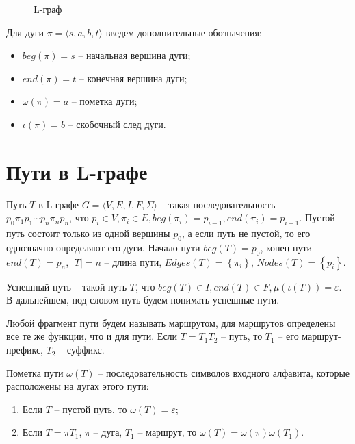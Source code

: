 \begin{figure}
    \centering
    
    \caption{L-граф}
    \label{lgraph1-expample-image}
    
\end{figure}

Для дуги $\pi = \langle s, a, b, t \rangle$ введем дополнительные обозначения:
\begin{itemize}
    \item $beg(\pi) = s$ -- начальная вершина дуги;
    \item $end(\pi) = t$ -- конечная вершина дуги;
    \item $\omega(\pi) = a$ -- пометка дуги;
    \item $\iota(\pi) = b$ -- скобочный след дуги.
\end{itemize}

\section{Пути в L-графе}
Путь $T$ в L-графе $G=\langle V,E,I,F,\Sigma\rangle$ -- такая последовательность \\ 
$p_0 \pi_1 p_1 \cdots p_n \pi_n p_n$, что 
$p_i \in V, \pi_i \in E, beg(\pi_i) = p_{i-1}, end(\pi_i) = p_{i+1}$.
Пустой путь состоит только из одной вершины $p_0$, а если путь не пустой, то его однозначно определяют его дуги.
Начало пути $beg(T) = p_0$, конец пути $end(T) = p_n$, $\left| T \right| = n$ -- длина пути, 
$Edges(T) = \left\{ \pi_i \right\}$, $Nodes(T) = \left\{ p_i \right\}$.

Успешный путь -- такой путь $T$, что $beg(T) \in I, end(T) \in F, \mu(\iota(T)) = \varepsilon$.
В дальнейшем, под словом путь будем понимать успешные пути.

Любой фрагмент пути будем называть маршрутом, для маршрутов определены все те же функции, что и для пути.
Если $T = T_1 T_2$ -- путь, то $T_1$ -- его маршрут-префикс, $T_2$ -- суффикс.

Пометка пути $\omega(T)$ -- последовательность символов входного алфавита, которые расположены на дугах этого пути:
\begin{enumerate}
    \item Если $T$ -- пустой путь, то $\omega(T) = \varepsilon$;
    \item Если $T = \pi T_1$, $\pi$ -- дуга, $T_1$ -- маршрут, то $\omega(T) = \omega(\pi) \omega(T_1)$.
\end{enumerate}

